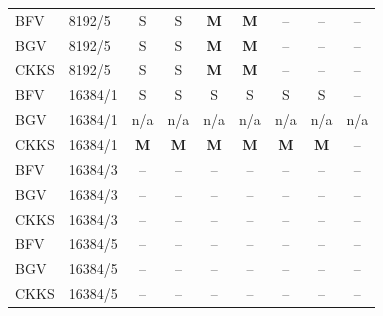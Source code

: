 \begin{longtable}{@{}llccccccc@{}}
BFV & 8192/5 & S & S & \textbf{M} & \textbf{M} & -- & -- & -- \\
BGV & 8192/5 & S & S & \textbf{M} & \textbf{M} & -- & -- & -- \\
CKKS & 8192/5 & S & S & \textbf{M} & \textbf{M} & -- & -- & -- \\
BFV & 16384/1 & S & S & S & S & S & S & -- \\
BGV & 16384/1 & n/a & n/a & n/a & n/a & n/a & n/a & n/a \\
CKKS & 16384/1 & \textbf{M} & \textbf{M} & \textbf{M} & \textbf{M} & \textbf{M} & \textbf{M} & -- \\
BFV & 16384/3 & -- & -- & -- & -- & -- & -- & -- \\
BGV & 16384/3 & -- & -- & -- & -- & -- & -- & -- \\
CKKS & 16384/3 & -- & -- & -- & -- & -- & -- & -- \\
BFV & 16384/5 & -- & -- & -- & -- & -- & -- & -- \\
BGV & 16384/5 & -- & -- & -- & -- & -- & -- & -- \\
CKKS & 16384/5 & -- & -- & -- & -- & -- & -- & -- \\
\bottomrule
\end{longtable}
